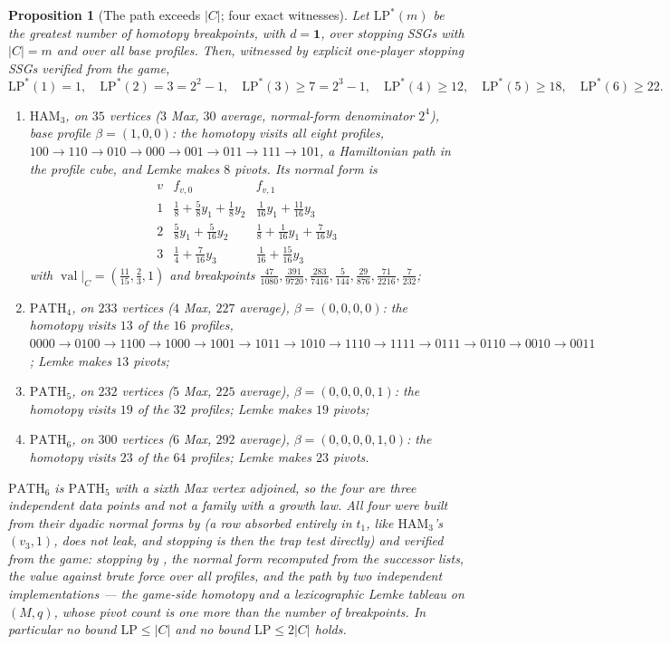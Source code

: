 \documentclass[11pt]{article}
\theoremstyle{plain}
\newtheorem{proposition}[theorem]{Proposition}
\theoremstyle{definition}
\DeclareMathOperator{\val}{val}
\newcommand{\bbone}{\mathbf{1}}
\begin{document}
\begin{proposition}[The path exceeds $|C|$; four exact witnesses]\label{prop:bias-witnesses}
Let $\mathrm{LP}^{\ast}(m)$ be the greatest number of homotopy breakpoints,
with $d=\bbone$, over stopping SSGs with $|C|=m$ and over all base profiles.
Then, witnessed by explicit \emph{one-player} stopping SSGs verified from the
game,
\[
  \mathrm{LP}^{\ast}(1)=1,\quad \mathrm{LP}^{\ast}(2)=3=2^{2}-1,\quad
  \mathrm{LP}^{\ast}(3)\ge7=2^{3}-1,\quad
  \mathrm{LP}^{\ast}(4)\ge12,\quad \mathrm{LP}^{\ast}(5)\ge18,\quad
  \mathrm{LP}^{\ast}(6)\ge22 .
\]
\begin{enumerate}[label=(\alph*),leftmargin=2.2em]
\item $\mathrm{HAM}_3$, on $35$ vertices ($3$ Max, $30$ average, normal-form
  denominator $2^{4}$), base profile $\beta=(1,0,0)$: the homotopy visits
  \emph{all eight} profiles,
  $100\to110\to010\to000\to001\to011\to111\to101$, a Hamiltonian path in the
  profile cube, and Lemke makes $8$ pivots. Its normal form is
  \[
  \begin{array}{l|ll}
   v & f_{v,0} & f_{v,1}\\\hline
   1 & \tfrac18+\tfrac58y_1+\tfrac18y_2 & \tfrac1{16}y_1+\tfrac{11}{16}y_3\\
   2 & \tfrac58y_1+\tfrac5{16}y_2 & \tfrac18+\tfrac1{16}y_1+\tfrac7{16}y_3\\
   3 & \tfrac14+\tfrac7{16}y_3 & \tfrac1{16}+\tfrac{15}{16}y_3
  \end{array}
  \]
  with $\val|_C=(\tfrac{11}{15},\tfrac23,1)$ and breakpoints
  $\tfrac{47}{1080},\tfrac{391}{9720},\tfrac{283}{7416},\tfrac5{144},
   \tfrac{29}{876},\tfrac{71}{2216},\tfrac7{232}$;
\item $\mathrm{PATH}_4$, on $233$ vertices ($4$ Max, $227$ average),
  $\beta=(0,0,0,0)$: the homotopy visits $13$ of the $16$ profiles,
  $0000\to0100\to1100\to1000\to1001\to1011\to1010\to1110\to1111\to0111\to
  0110\to0010\to0011$; Lemke makes $13$ pivots;
\item $\mathrm{PATH}_5$, on $232$ vertices ($5$ Max, $225$ average),
  $\beta=(0,0,0,0,1)$: the homotopy visits $19$ of the $32$ profiles; Lemke
  makes $19$ pivots;
\item $\mathrm{PATH}_6$, on $300$ vertices ($6$ Max, $292$ average),
  $\beta=(0,0,0,0,1,0)$: the homotopy visits $23$ of the $64$ profiles; Lemke
  makes $23$ pivots.
\end{enumerate}
$\mathrm{PATH}_6$ is $\mathrm{PATH}_5$ with a sixth Max vertex adjoined,
so the four are three independent data points and not a family with a
growth law. All four were built from their dyadic normal forms by 
(a row absorbed entirely in $t_1$, like $\mathrm{HAM}_3$'s $(v_3,1)$,
does not leak, and stopping is then the trap test directly)
and verified \emph{from the game}: stopping by , the normal
form recomputed from the successor lists, the value against brute force over
all profiles, and the path by two independent implementations --- the
game-side homotopy and a lexicographic Lemke tableau on $(M,q)$, whose pivot
count is one more than the number of breakpoints. In particular no bound
$\mathrm{LP}\le|C|$ and no bound $\mathrm{LP}\le2|C|$ holds.
\end{proposition}
\end{document}
